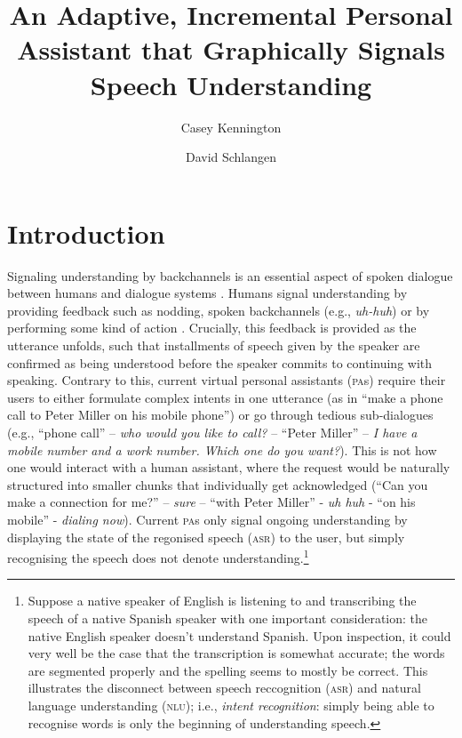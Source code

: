 \documentclass[11pt]{article}
\title{An Adaptive, Incremental Personal Assistant that Graphically Signals Speech Understanding}
\author{Casey Kennington \and David Schlangen}
\newcommand{\nlu}[0]{\textsc{nlu}}
\newcommand{\asr}[0]{\textsc{asr}}
\newcommand{\pa}[0]{\textsc{pa}}
\begin{document}

\maketitle

\begin{abstract}

\end{abstract}

\section{Introduction}
\label{section:intro}

Signaling understanding by backchannels is an essential aspect of spoken dialogue between humans and dialogue systems \cite{Yankelovich1995}. Humans signal understanding by providing feedback such as nodding, spoken backchannels (e.g., \emph{uh-huh}) or by performing some kind of action \cite{Clark1996}. Crucially, this feedback is provided as the utterance unfolds, such that installments of speech given by the speaker are confirmed as being understood before the speaker commits to continuing with speaking. Contrary to this, current virtual personal assistants (\pa s) require their users to either formulate complex intents in one utterance (as in ``make a phone call to Peter Miller on his mobile phone'') or go through tedious sub-dialogues (e.g., ``phone call'' -- \emph{who would you like to call?} -- ``Peter Miller'' -- \emph{I have a mobile number and a work number. Which one do you want?}). This is not how one would interact with a human assistant, where the request would be naturally structured into smaller chunks that individually get acknowledged (``Can you make a connection for me?'' -- \emph{sure} -- ``with Peter Miller'' - \emph{uh huh} - ``on his mobile'' - \emph{dialing now}). Current \pa s only signal ongoing understanding by displaying the state of the regonised speech (\asr) to the user, but simply recognising the speech does not denote understanding.\footnote{Suppose a native speaker of English is listening to and transcribing the speech of a native Spanish speaker with one important consideration: the native English speaker doesn't understand Spanish. Upon inspection, it could very well be the case that the transcription is somewhat accurate; the words are segmented properly and the spelling seems to mostly be correct. This illustrates the disconnect between speech reccognition (\asr) and natural language understanding (\nlu); i.e., \emph{intent recognition}: simply being able to recognise words is only the beginning of understanding speech.}
\end{document}

